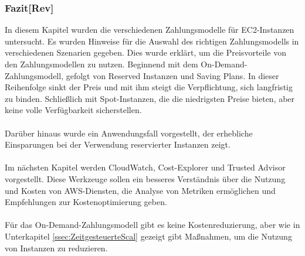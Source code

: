 \subsubsection*{Fazit[Rev]}
In diesem Kapitel wurden die verschiedenen Zahlungsmodelle für EC2-Instanzen untersucht. Es wurden Hinweise für die Auswahl des richtigen Zahlungsmodells in verschiedenen Szenarien gegeben. Dies wurde erklärt, um die Preisvorteile von den Zahlungsmodellen zu nutzen. Beginnend mit dem On-Demand-Zahlungsmodell, gefolgt von Reserved Instanzen und Saving Plans. In dieser Reihenfolge sinkt der Preis und mit ihm steigt die Verpflichtung, sich langfristig zu binden. Schließlich mit Spot-Instanzen, die die niedrigsten Preise bieten, aber keine volle Verfügbarkeit sicherstellen. %
\\\\
Darüber hinaus wurde ein Anwendungsfall vorgestellt, der erhebliche Einsparungen bei der Verwendung reservierter Instanzen zeigt.
\\\\
Im nächsten Kapitel werden CloudWatch, Cost-Explorer und Trusted Advisor vorgestellt. Diese Werkzeuge sollen ein besseres Verständnis über die Nutzung und Kosten von AWS-Diensten, die Analyse von Metriken ermöglichen und Empfehlungen zur Kostenoptimierung geben.
\\\\
Für das On-Demand-Zahlungsmodell gibt es keine Kostenreduzierung, aber wie in Unterkapitel \ref{ssec:ZeitgesteuerteScal} gezeigt gibt Maßnahmen, um die Nutzung von Instanzen zu reduzieren. %